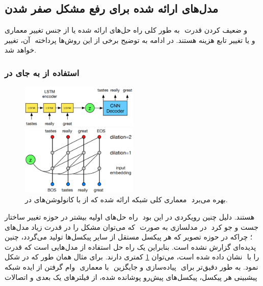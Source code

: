 \subsection{مدل‌های ارائه شده برای رفع مشکل صفر شدن }
به طور کلی راه حل‌های ارائه شده یا از جنس تغییر معماری ‎\decoder{}‎ و ضعیف کردن قدرت ‎\autoregressive{}‎ آن، تغییر ‎\priordist{}‎ و یا تغییر تابع هزینه هستند. در ادامه به توضیح برخی از این روش‌ها پرداخته خواهد شد.
\subsubsection{استفاده از \cnn{} به جای \lstm{} در \decoder{}}
\begin{figure}[h]
	\centering
	\includegraphics[width=0.5\textwidth]{images/dialated-conv1.png}

	\vspace{0.5cm}

	\includegraphics[width=0.5\textwidth]{images/dialated-conv2.png}
	\caption{
		معماری کلی شبکه ارائه شده که از \cnn{}  با کانولوشن‌های \dilated{} در  ‎\decoder{}‎ بهره می‌برد.
	}
	\label{fig:dialted_conv}
\end{figure}
راه حل‌های اولیه بیشتر در حوزه تغییر ساختار ‎\decoder{}‎ هستند. دلیل چنین رویکردی در این بود که می‌توان مشکل را در قدرت زیاد مدل‌های ‎\lstm{} در مدلسازی به صورت ‎\autoregressive{}‎ جست و جو کرد \cite{vae_dialated}؛ چراکه در حوزه تصویر که هر پیکسل مستقل از سایر پیکسل‌ها تولید می‌گردد، چنین پدیده‌ای گزارش نشده است. بنابراین یک راه حل استفاده از مدل‌هایی است که قدرت \autoregressive{} کمتری دارند. برای مثال همان طور که در شکل ‎\ref{fig:dialted_conv}‎ نشان داده شده است، می‌توان ‎\decoder{}‎ را با وام گرفتن از ایده شبکه ‎‎ با معماری ‎\cnn{}‎ پیاده‌سازی و جایگزین ‎\lstm{}‎ نمود. به طور دقیق‌تر برای پیشبینی هر پیکسل، پیکسل‌های پیش‌رو پوشانده شده، از فیلتر‌های یک بعدی و اتصالات
